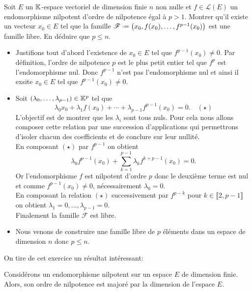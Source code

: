 \begin{exercice}
    Soit $E$ un $\mathbb{K}$-espace vectoriel de dimension finie $n$ non nulle et $f \in \mathscr{L}(E)$ un endomorphisme nilpotent d'ordre de nilpotence égal à $p > 1$. Montrer qu'il existe un vecteur $x_0 \in E$ tel que la famille $\mathscr{F} \defeq \big(x_0, f(x_0), \dots, f^{p-1}(x_0) \big)$ est une famille libre. En déduire que $p \leqslant n$. 
\end{exercice}    

\begin{solution}
    \begin{itemize}
        \item Justifions tout d'abord l'existence de $x_0 \in E$ tel que $f^{p-1}(x_0) \not= 0$. Par définition, l'ordre de nilpotence $p$ est le plus petit entier tel que $f^p$ est l'endomorphisme nul. Donc $f^{p-1}$ n'est pas l'endomorphisme nul et ainsi il exsite $x_0 \in E$ tel que $f^{p-1}(x_0) \not= 0$.
        \item Soit $(\lambda_0, \dots, \lambda_{p-1}) \in \mathbb{K}^p$ tel que 
        $$\lambda_0 x_0 + \lambda_1 f(x_0) + \cdots + \lambda_{p-1} f^{p-1}(x_0) = 0. \quad (\star)$$
        L'objectif est de montrer que les $\lambda_i$ sont tous nuls. Pour cela nous allons composer cette relation par une succession d'applications qui permettrons d'isoler chacun des coefficients et de conclure sur leur nullité. \\
        En composant $(\star)$ par $f^{p-1}$ on obtient
        $$\lambda_0 f^{p-1}(x_0) + \sum_{k=1}^{p-1} \lambda_k f^{k + p-1}(x_0) = 0.$$
        Or l'endomorphisme $f$ est nilpotent d'ordre $p$ donc le deuxième terme est nul et comme $f^{p-1}(x_0) \not= 0$, nécessairement $\lambda_0 = 0$. \\
        En composant la relation $(\star)$ successivement par $f^{p - k}$ pour $k \in \llbracket 2, p-1 \rrbracket$ on obtient $\lambda_1 = 0, \dots, \lambda_{p-1} = 0$. \\
        Finalement la famille $\mathscr{F}$ est libre.
        \item Nous venons de construire une famille libre de $p$ éléments dans un espace de dimension $n$ donc $p \leqslant n$. 
    \end{itemize}
\end{solution}
On tire de cet exercice un résultat intéressant:
\begin{prop}{}
    Considérons un endomorphisme nilpotent sur un espace $E$ de dimension finie. Alors, son ordre de nilpotence est majoré par la dimension de l'espace $E$.
\end{prop}
